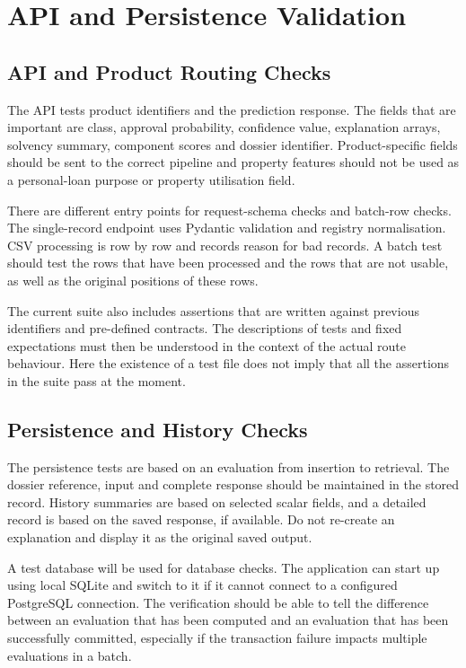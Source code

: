 \section{API and Persistence Validation}
\subsection{API and Product Routing Checks}
The API tests product identifiers and the prediction response. The fields that are important are class, approval probability, confidence value, explanation arrays, solvency summary, component scores and dossier identifier. Product-specific fields should be sent to the correct pipeline and property features should not be used as a personal-loan purpose or property utilisation field.

There are different entry points for request-schema checks and batch-row checks. The single-record endpoint uses Pydantic validation and registry normalisation. CSV processing is row by row and records reason for bad records. A batch test should test the rows that have been processed and the rows that are not usable, as well as the original positions of these rows.

The current suite also includes assertions that are written against previous identifiers and pre-defined contracts. The descriptions of tests and fixed expectations must then be understood in the context of the actual route behaviour. Here the existence of a test file does not imply that all the assertions in the suite pass at the moment.

\subsection{Persistence and History Checks}
The persistence tests are based on an evaluation from insertion to retrieval. The dossier reference, input and complete response should be maintained in the stored record. History summaries are based on selected scalar fields, and a detailed record is based on the saved response, if available. Do not re-create an explanation and display it as the original saved output.

A test database will be used for database checks. The application can start up using local SQLite and switch to it if it cannot connect to a configured PostgreSQL connection. The verification should be able to tell the difference between an evaluation that has been computed and an evaluation that has been successfully committed, especially if the transaction failure impacts multiple evaluations in a batch.

